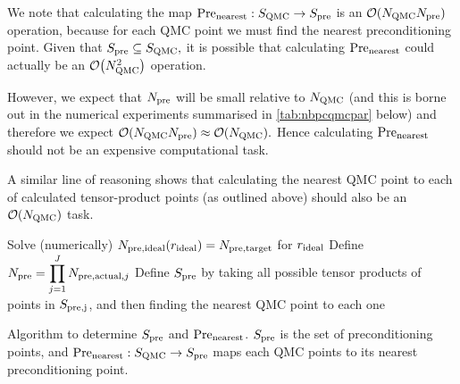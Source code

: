    We note that calculating the map $\mathrm{Pre}_{\mathrm{nearest}}:S_{\mathrm{QMC}}\rightarrow S_{\mathrm{pre}}$ is an $\cO\mleft(\NQMC\Npre\mright)$ operation, because for each QMC point we must find the nearest preconditioning point. Given that $S_{\mathrm{pre}} \subseteq S_{\mathrm{QMC}},$ it is possible that calculating $\mathrm{Pre}_{\mathrm{nearest}}$ could actually be an $\cO\mleft(\NQMC^2\mright)$ operation.

    However, we expect that $N_{\mathrm{pre}}$ will be small relative to $N_{\mathrm{QMC}}$ (and this is borne out in the numerical experiments summarised in \cref{tab:nbpcqmcpar} below) and therefore we expect $\cO\mleft(\NQMC\Npre\mright) \approx \cO\mleft(\NQMC\mright).$ Hence calculating $\mathrm{Pre}_{\mathrm{nearest}}$ should not be an expensive computational task.

    A similar line of reasoning shows that calculating the nearest QMC point to each of calculated tensor-product points (as outlined above) should also be an $\cO\mleft(\NQMC\mright)$ task.
    \ere



\begin{algorithm}[h]
\DontPrintSemicolon
{}

\Input{$\Npretarget \in \NN$}
\BlankLine
Solve (numerically) $N_{\mathrm{pre,ideal}}(r_{\mathrm{ideal}}) = N_{\mathrm{pre,target}}$ for $r_{\mathrm{ideal}}$\;
Define $\displaystyle N_{\mathrm{pre}} = \prod_{j=1}^J N_{\mathrm{pre,actual},j}$\;
Define $S_{\mathrm{pre}}$ by taking all possible tensor products of points in $S_{\mathrm{pre,j}}$, and then finding the nearest QMC point to each one\;
\caption{Algorithm to determine $S_{\mathrm{pre}}$ and $\mathrm{Pre}_{\mathrm{nearest}}$\label{alg:par}. $S_{\mathrm{pre}}$ is the set of preconditioning points, and $\mathrm{Pre}_{\mathrm{nearest}}:S_{\mathrm{QMC}}\rightarrow S_{\mathrm{pre}}$ maps each QMC points to its nearest preconditioning point.}
\end{algorithm}

